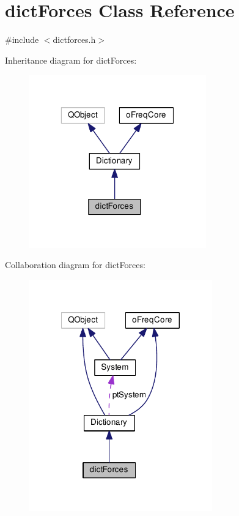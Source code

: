 \hypertarget{classdict_forces}{\section{dict\-Forces Class Reference}
\label{classdict_forces}
}


{\ttfamily \#include $<$dictforces.\-h$>$}



Inheritance diagram for dict\-Forces\-:\nopagebreak
\begin{figure}[H]
\begin{center}
\leavevmode
\includegraphics[width=217pt]{classdict_forces__inherit__graph}
\end{center}
\end{figure}


Collaboration diagram for dict\-Forces\-:\nopagebreak
\begin{figure}[H]
\begin{center}
\leavevmode
\includegraphics[width=224pt]{classdict_forces__coll__graph}
\end{center}
\end{figure}
